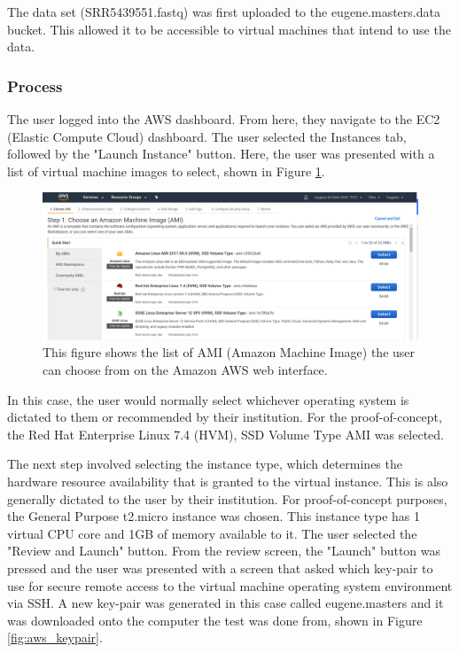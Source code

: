 The data set (SRR5439551.fastq) was first uploaded to the eugene.masters.data bucket. This allowed it to be accessible to virtual machines that intend to use the data.

\subsubsection{Process}

The user logged into the AWS dashboard. From here, they navigate to the EC2 (Elastic Compute Cloud) dashboard. The user selected the Instances tab, followed by the "Launch Instance" button. Here, the user was presented with a list of virtual machine images to select, shown in Figure \ref{fig:aws_ami}.

\begin{figure}[h!]
\centering
\includegraphics[width=\textwidth]{Figures/4_aws_select_instance.png}
\decoRule
\caption[List of Amazon Machine Images Available on AWS]{This figure shows the list of AMI (Amazon Machine Image) the user can choose from on the Amazon AWS web interface.}
\label{fig:aws_ami}
\end{figure}

In this case, the user would normally select whichever operating system is dictated to them or recommended by their institution. For the proof-of-concept, the Red Hat Enterprise Linux 7.4 (HVM), SSD Volume Type AMI was selected.

The next step involved selecting the instance type, which determines the hardware resource availability that is granted to the virtual instance. This is also generally dictated to the user by their institution. For proof-of-concept purposes, the General Purpose t2.micro instance was chosen. This instance type has 1 virtual CPU core and 1GB of memory available to it. The user selected the "Review and Launch" button. From the review screen, the "Launch" button was pressed and the user was presented with a screen that asked which key-pair to use for secure remote access to the virtual machine operating system environment via SSH. A new key-pair was generated in this case called eugene.masters and it was downloaded onto the computer the test was done from, shown in Figure \ref{fig:aws_keypair}.

